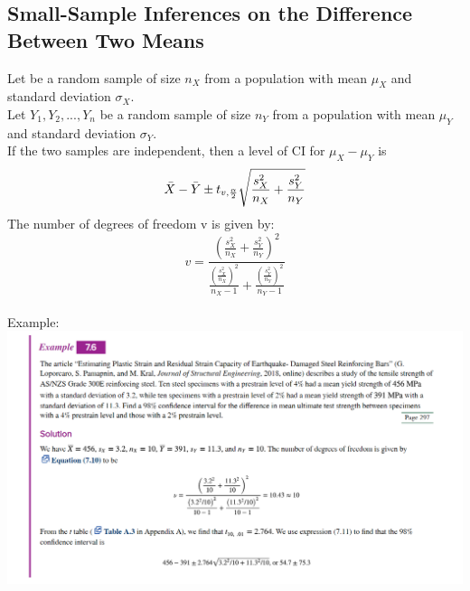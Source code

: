 \documentclass[../main.tex]{subfiles}
\begin{document}
\subsection{Small-Sample Inferences on the Difference Between Two Means}
Let \xotn be a random sample of size $n_X$ from a population with mean $\mu_X$ and standard deviation $\sigma_X$.\\
Let $Y_1, Y_2,...,Y_n$ be a random sample of size $n_Y$ from a population with mean $\mu_Y$ and standard deviation $\sigma_Y$.\\
If the two samples are independent, then a level of \cia CI for $\mu_X-\mu_Y$ is
\begin{equation*}
    \bar{X}-\bar{Y} \pm t_{v,\frac{\alpha}{2}} \sqrt{\frac{s_X^2}{n_X}+\frac{s_Y^2}{n_Y}}
\end{equation*}
The number of degrees of freedom v is given by:
\begin{equation*}
    v=\displaystyle \frac{\displaystyle(\frac{s_X^2}{n_X}+\frac{s_Y^2}{n_Y})^2}{\displaystyle\frac{(\frac{s_X^2}{n_X})^2}{n_X-1}+\displaystyle\frac{(\frac{s_Y^2}{n_Y})^2}{n_Y-1}}
\end{equation*}\\
Example:\\
\includegraphics[width = 18cm]{Sections/Image/eg76.png}
\end{document}
